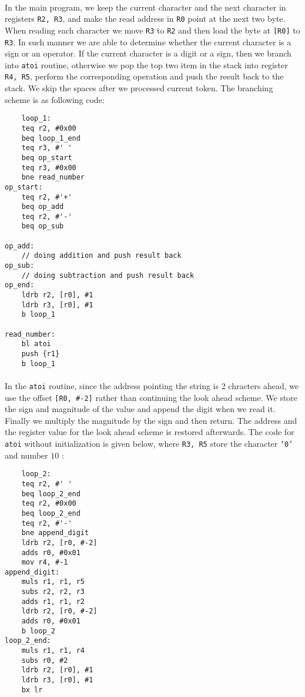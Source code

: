 \paragraph{}
In the main program, we keep the current character and the next character in registers \texttt{R2, R3}, and make the read address in \texttt{R0} point at the next two byte. When reading each character we move \texttt{R3} to \texttt{R2} and then load the byte at \texttt{[R0]} to \texttt{R3}. In such manner we are able to determine whether the current character is a sign or an operator. If the current character is a digit or a sign, then we branch into \texttt{atoi} routine, otherwise we pop the top two item in the stack into register \texttt{R4, R5}, perform the corresponding operation and push the result back to the stack. We skip the spaces after we processed current token. The branching scheme is as following code:
\begin{lstlisting}
    loop_1:
    teq r2, #0x00
    beq loop_1_end
    teq r3, #' '
    beq op_start
    teq r3, #0x00
    bne read_number
op_start:
    teq r2, #'+'
    beq op_add
    teq r2, #'-'
    beq op_sub

op_add:
    // doing addition and push result back
op_sub:
    // doing subtraction and push result back
op_end:
    ldrb r2, [r0], #1
    ldrb r3, [r0], #1
    b loop_1

read_number:
    bl atoi
    push {r1}
    b loop_1
\end{lstlisting}

\paragraph{}
In the \texttt{atoi} routine, since the address pointing the string is 2 chracters ahead, we use the offset \texttt{[R0, \#-2]} rather than continuing the look ahead scheme. We store the sign and magnitude of the value and append the digit when we read it. Finally we multiply the magnitude by the sign and then return. The address and the register value for the look ahead scheme is restored afterwards. The code for \texttt{atoi} without initialization is given below, where \texttt{R3, R5} store the character \texttt{'0'} and number $10$ :
\begin{lstlisting}
    loop_2:
    teq r2, #' '
    beq loop_2_end
    teq r2, #0x00
    beq loop_2_end
    teq r2, #'-'
    bne append_digit
    ldrb r2, [r0, #-2]
    adds r0, #0x01
    mov r4, #-1
append_digit:
    muls r1, r1, r5
    subs r2, r2, r3
    adds r1, r1, r2
    ldrb r2, [r0, #-2]
    adds r0, #0x01
    b loop_2
loop_2_end:
    muls r1, r1, r4
    subs r0, #2
    ldrb r2, [r0], #1
    ldrb r3, [r0], #1
    bx lr
\end{lstlisting}
